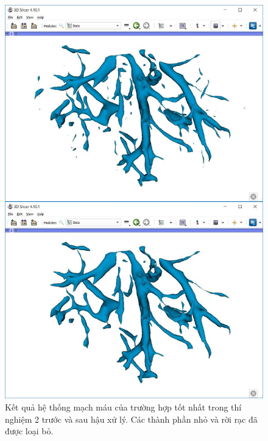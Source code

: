 	
	\begin{figure}[h!]
		\includegraphics[width=\textwidth, height=.925\textheight]{figures/result_e2_best_prediction_post_processing}
		\caption[Kết quả hệ thống mạch máu của trường hợp tốt nhất trong thí nghiệm 2.]{Kết quả hệ thống mạch máu của trường hợp tốt nhất trong thí nghiệm 2 trước và sau hậu xử lý. Các thành phần nhỏ và rời rạc đã được loại bỏ.}
		\label{fig:result_e2_best_prediction_post_processing}
	\end{figure}
